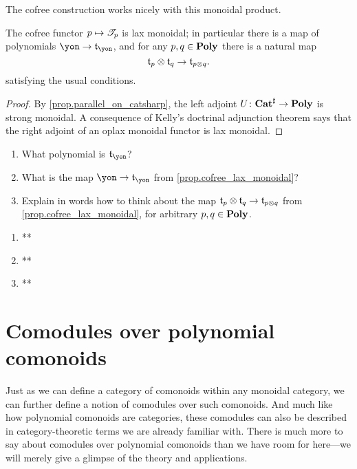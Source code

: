\documentclass[Book-Poly]{subfiles}
\begin{document}
The cofree construction works nicely with this monoidal product.

\begin{proposition}\label{prop.cofree_lax_monoidal}
The cofree functor $p\mapsto\mathscr{T}_{p}$ is lax monoidal; in particular there is a map of polynomials $\yon\to\car{t}_\yon$, and for any $p,q\in\mathbf{Poly}$ there is a natural map
\[
	\mathfrak{t}_p\otimes\mathfrak{t}_q\to\mathfrak{t}_{p\otimes q}.
\]
satisfying the usual conditions.
\end{proposition}
\begin{proof}
By \cref{prop.parallel_on_catsharp}, the left adjoint $U\colon\mathbf{Cat}^\sharp\to\mathbf{Poly}$ is strong monoidal. A consequence of Kelly's doctrinal adjunction theorem \cite{kelly1974doctrinal} says that the right adjoint of an oplax monoidal functor is lax monoidal.
\end{proof}

\begin{exercise}
\begin{enumerate}
	\item What polynomial is $\car{t}_\yon$?
	\item What is the map $\yon\to\car{t}_\yon$ from \cref{prop.cofree_lax_monoidal}?
	\item Explain in words how to think about the map $\mathfrak{t}_p\otimes\mathfrak{t}_q\to\mathfrak{t}_{p\otimes q}$ from \cref{prop.cofree_lax_monoidal}, for arbitrary $p,q\in\mathbf{Poly}$.
\qedhere
\end{enumerate}
\begin{solution}
\begin{enumerate}
    \item **
    \item **
    \item **
\end{enumerate}
\end{solution}
\end{exercise}


\section{Comodules over polynomial comonoids}

Just as we can define a category of comonoids within any monoidal category, we can further define a notion of comodules over such comonoids.
And much like how polynomial comonoids are categories, these comodules can also be described in category-theoretic terms we are already familiar with.
There is much more to say about comodules over polynomial comonoids than we have room for here---we will merely give a glimpse of the theory and applications.
\end{document}
